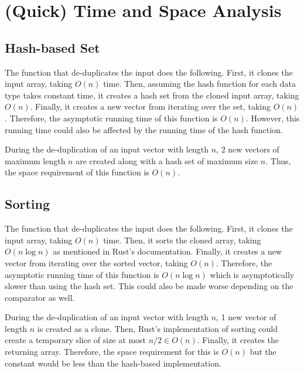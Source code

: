 \section{(Quick) Time and Space Analysis}

\subsection*{Hash-based Set}

The function that de-duplicates the input does the following. First, it clones the input array, taking $O(n)$ time.
Then, assuming the hash function for each data type takes constant time, it creates a hash set from the cloned input array, taking $O(n)$.
Finally, it creates a new vector from iterating over the set, taking $O(n)$. Therefore, the asymptotic running time of this function is $O(n)$. However, this running time could also be affected by the running time of the hash function.

During the de-duplication of an input vector with length $n$, 2 new vectors of maximum length $n$ are created along with a hash set of maximum size $n$. Thus, the space requirement of this function is $O(n)$.

\subsection*{Sorting}

The function that de-duplicates the input does the following. First, it clones the input array, taking $O(n)$ time.
Then, it sorts the cloned array, taking $O(n \log n)$ as mentioned in Rust's documentation.
Finally, it creates a new vector from iterating over the sorted vector, taking $O(n)$. Therefore, the asymptotic running time of this function is $O(n \log n)$ which is asymptotically slower than using the hash set. This could also be made worse depending on the comparator as well.

During the de-duplication of an input vector with length $n$, 1 new vector of length $n$ is created as a clone. Then, Rust's implementation of sorting could create a temporary slice of size at most $n/2 \in O(n)$. Finally, it creates the returning array. Therefore, the space requirement for this is $O(n)$ but the constant would be less than the hash-based implementation.

\newpage


